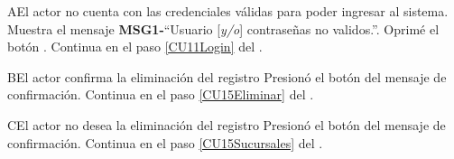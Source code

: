 		\begin{UCtrayectoriaA}{A}{El actor no cuenta con las credenciales válidas para poder ingresar al sistema.}
			\UCpaso Muestra el mensaje {\bf MSG1-}``Usuario [{\em y/o}] contraseñas no validos.''.
			\UCpaso[\UCactor] Oprimé el botón .
			\UCpaso Continua en el paso \ref{CU11Login} del .
		\end{UCtrayectoriaA}
		
		\begin{UCtrayectoriaA}{B}{El actor confirma la eliminación del registro}
			\UCpaso[\UCactor] Presionó el botón  del mensaje de confirmación.
			\UCpaso Continua en el paso \ref{CU15Eliminar} del . 
		\end{UCtrayectoriaA}
		
		\begin{UCtrayectoriaA}{C}{El actor no desea la eliminación del registro}
			\UCpaso[\UCactor] Presionó el botón  del mensaje de confirmación.
			\UCpaso Continua en el paso \ref{CU15Sucursales} del . 
		\end{UCtrayectoriaA}		

